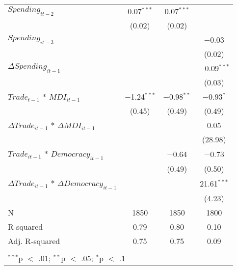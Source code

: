 \begin{table}[!htbp]
\begin{tabular}{@{\extracolsep{5pt}}lccc}
  $Spending_{it-2}$ & 0.07$^{***}$ & 0.07$^{***}$ &  \\ 
  & (0.02) & (0.02) &  \\ 
  $Spending_{it-3}$ &  &  & $-$0.03 \\ 
  &  &  & (0.02) \\ 
  $\Delta Spending_{it-1}$ &  &  & $-$0.09$^{***}$ \\ 
  &  &  & (0.03) \\ 
  $Trade_{t-1}$ * $MDI_{it-1}$ & $-$1.24$^{***}$ & $-$0.98$^{**}$ & $-$0.93$^{*}$ \\ 
  & (0.45) & (0.49) & (0.49) \\ 
  $\Delta Trade_{it-1}$ * $\Delta MDI_{it-1}$ &  &  & 0.05 \\ 
  &  &  & (28.98) \\ 
  $Trade_{it-1}$ * $Democracy_{it-1}$ &  & $-$0.64 & $-$0.73 \\ 
  &  & (0.49) & (0.50) \\ 
  $\Delta Trade_{it-1}$ * $\Delta Democracy_{it-1}$ &  &  & 21.61$^{***}$ \\ 
  &  &  & (4.23) \\ 
 N & 1850 & 1850 & 1800 \\ 
R-squared & 0.79 & 0.80 & 0.10 \\ 
Adj. R-squared & 0.75 & 0.75 & 0.09 \\ 
\hline \\[-1.8ex] 
\multicolumn{4}{l}{$^{***}$p $<$ .01; $^{**}$p $<$ .05; $^{*}$p $<$ .1} \\ 
\end{tabular} 
\end{table} 
